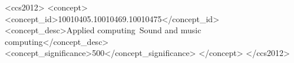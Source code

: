 \documentclass{sig-alternate}
\begin{document}
%
%
\begin{CCSXML}
<ccs2012>
	<concept>
		<concept_id>10010405.10010469.10010475</concept_id>
		<concept_desc>Applied computing~Sound and music computing</concept_desc>
		<concept_significance>500</concept_significance>
	</concept>
</ccs2012>
\end{CCSXML}



%
%

%
%
\printccsdesc


\end{document}
